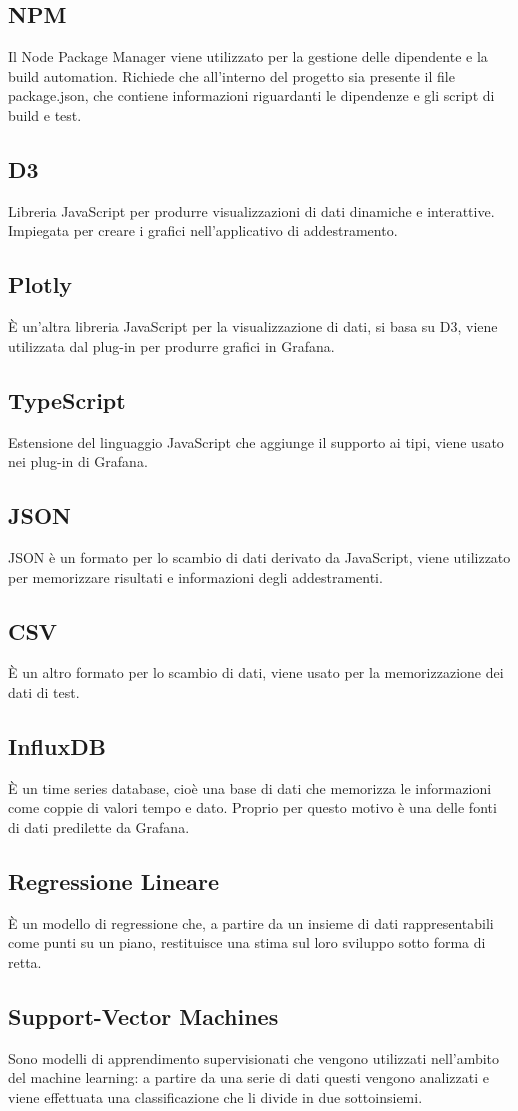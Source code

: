	\subsection{NPM}
		Il Node Package Manager viene utilizzato per la gestione delle dipendente e la build automation.
		Richiede che all'interno del progetto sia presente il file package.json, che contiene informazioni riguardanti le dipendenze e gli script di build e test.
	\subsection{D3}
		Libreria JavaScript per produrre visualizzazioni di dati dinamiche e interattive. Impiegata per creare i grafici nell'applicativo di addestramento.
	\subsection{Plotly}
		È un'altra libreria JavaScript per la visualizzazione di dati, si basa su D3, viene utilizzata dal plug-in per produrre grafici in Grafana\glo.
	\subsection{TypeScript}
		Estensione del linguaggio JavaScript che aggiunge il supporto ai tipi, viene usato nei plug-in di Grafana\glo.
	\subsection{JSON}
		JSON è un formato per lo scambio di dati derivato da JavaScript, viene utilizzato per memorizzare risultati e informazioni degli addestramenti.
	\subsection{CSV}
		È un altro formato per lo scambio di dati, viene usato per la memorizzazione dei dati di test.
	\subsection{InfluxDB}
		È un time series database, cioè una base di dati che memorizza le informazioni come coppie di valori tempo e dato. Proprio per questo motivo è una delle fonti di dati predilette da Grafana\glo.
	\subsection{Regressione Lineare}
		È un modello di regressione che, a partire da un insieme di dati rappresentabili come punti su un piano, restituisce una stima sul loro sviluppo sotto forma di retta.
	\subsection{Support-Vector Machines}
		Sono modelli di apprendimento supervisionati che vengono utilizzati nell'ambito del machine learning\glo: a partire da una serie di dati questi vengono analizzati e viene effettuata una classificazione che li divide in due sottoinsiemi.




